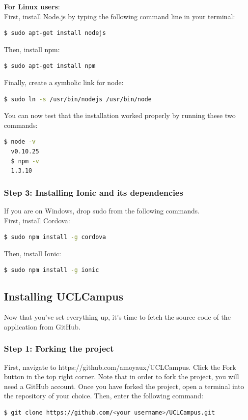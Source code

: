 \documentclass{eplmastersthesis}
\begin{document}
\textbf{For Linux users}: \\
First, install Node.js by typing the following command line in your terminal:
\begin{lstlisting}[language=bash]
  $ sudo apt-get install nodejs
\end{lstlisting}
Then, install npm:
\begin{lstlisting}[language=bash]
  $ sudo apt-get install npm
\end{lstlisting}
Finally, create a symbolic link for node:
\begin{lstlisting}[language=bash]
  $ sudo ln -s /usr/bin/nodejs /usr/bin/node
\end{lstlisting}
You can now test that the installation worked properly by running these two commands:
\begin{lstlisting}[language=bash]
  $ node -v
  v0.10.25
  $ npm -v
  1.3.10
\end{lstlisting}
\subsubsection{Step 3: Installing Ionic and its dependencies}
If you are on Windows, drop sudo from the following commands.
\\First, install Cordova:
\begin{lstlisting}[language=bash]
   $ sudo npm install -g cordova
\end{lstlisting}
Then, install Ionic:
\begin{lstlisting}[language=bash]
   $ sudo npm install -g ionic
\end{lstlisting}
\subsection{Installing UCLCampus}
Now that you've set everything up, it's time to fetch the source code of the application from GitHub. 
\subsubsection{Step 1: Forking the project}
First, navigate to https://github.com/amoyaux/UCLCampus. Click the Fork button in the top right corner. Note that in order to fork the project, you will need a GitHub account.
Once you have forked the project, open a terminal into the repository of your choice. Then, enter the following command:
\begin{lstlisting}[language=bash]
   $ git clone https://github.com/<your username>/UCLCampus.git
\end{lstlisting}
\end{document}
